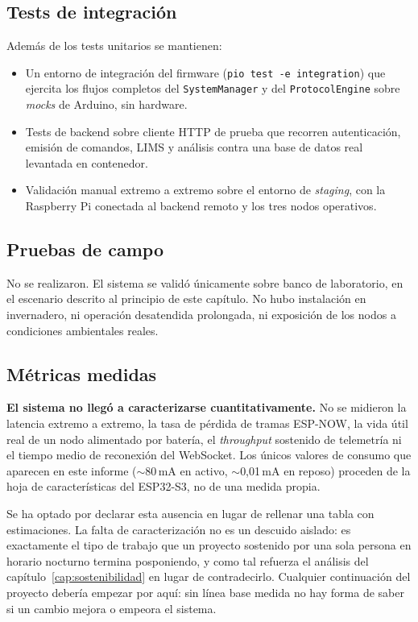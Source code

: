 \subsection{Tests de integraci\'on}

Adem\'as de los tests unitarios se mantienen:

\begin{itemize}[leftmargin=*]
    \item Un entorno de integraci\'on del firmware
    (\texttt{pio test -e integration}) que ejercita los flujos completos
    del \texttt{SystemManager} y del \texttt{ProtocolEngine} sobre
    \textit{mocks} de Arduino, sin hardware.
    \item Tests de backend sobre cliente HTTP de prueba que recorren
    autenticaci\'on, emisi\'on de comandos, LIMS y an\'alisis contra una
    base de datos real levantada en contenedor.
    \item Validaci\'on manual extremo a extremo sobre el entorno de
    \textit{staging}, con la Raspberry Pi conectada al backend remoto y
    los tres nodos operativos.
\end{itemize}

\subsection{Pruebas de campo}

No se realizaron. El sistema se valid\'o \'unicamente sobre banco de
laboratorio, en el escenario descrito al principio de este cap\'itulo.
No hubo instalaci\'on en invernadero, ni operaci\'on desatendida
prolongada, ni exposici\'on de los nodos a condiciones ambientales
reales.

\subsection{M\'etricas medidas}

\textbf{El sistema no lleg\'o a caracterizarse cuantitativamente.} No se
midieron la latencia extremo a extremo, la tasa de p\'erdida de tramas
ESP-NOW, la vida \'util real de un nodo alimentado por bater\'ia, el
\textit{throughput} sostenido de telemetr\'ia ni el tiempo medio de
reconexi\'on del WebSocket. Los \'unicos valores de consumo que aparecen
en este informe ($\sim$80\,mA en activo, $\sim$0,01\,mA en reposo)
proceden de la hoja de caracter\'isticas del ESP32-S3, no de una medida
propia.

Se ha optado por declarar esta ausencia en lugar de rellenar una tabla
con estimaciones. La falta de caracterizaci\'on no es un descuido
aislado: es exactamente el tipo de trabajo que un proyecto sostenido por
una sola persona en horario nocturno termina posponiendo, y como tal
refuerza el an\'alisis del cap\'itulo~\ref{cap:sostenibilidad} en lugar de
contradecirlo. Cualquier continuaci\'on del proyecto deber\'ia empezar
por aqu\'i: sin l\'inea base medida no hay forma de saber si un cambio
mejora o empeora el sistema.
